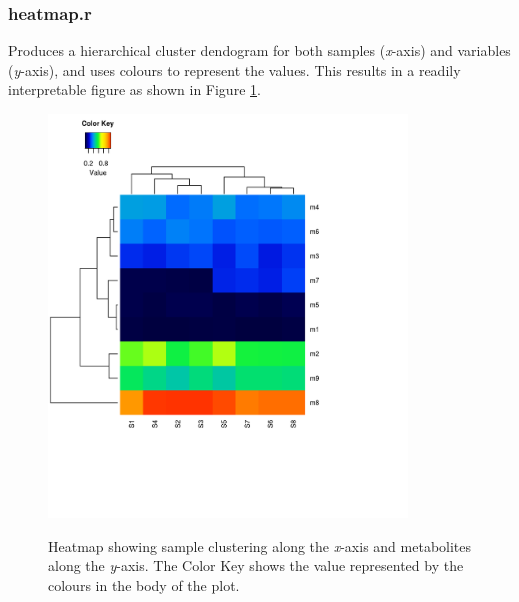 \documentclass[english,a4paper,12pt]{article}
\begin{document}
\subsubsection*{heatmap.r}
Produces a hierarchical cluster dendogram for both samples (\emph{x}-axis) and variables (\emph{y}-axis), and uses colours to represent the values. This results in a readily interpretable figure as shown in Figure \ref{fig:heatmap}.

\begin{figure}[!h!bt]
    \centering
    \includegraphics[width=0.85\textwidth]{images/heatmap.png} \\
    \caption[Heatmap]{Heatmap showing sample clustering along the \emph{x}-axis and metabolites along the \emph{y}-axis. The Color Key shows the value represented by the colours in the body of the plot.}
    \label{fig:heatmap}
\end{figure}
\end{document}
